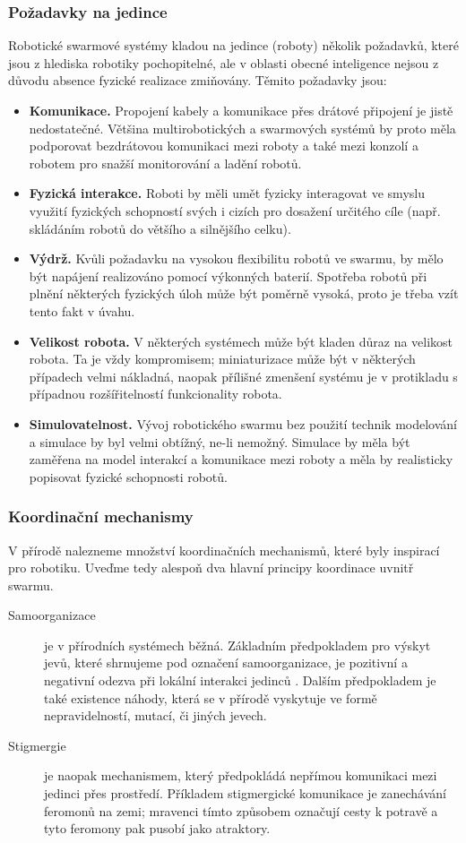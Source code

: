 \documentclass[a4paper,12pt]{article}
\begin{document}
\subsubsection{Požadavky na jedince}
Robotické swarmové systémy kladou na jedince (roboty) několik požadavků, které jsou
z hlediska robotiky pochopitelné, ale v oblasti obecné inteligence nejsou z důvodu
absence fyzické realizace zmiňovány. Těmito požadavky jsou:
\begin{itemize}
  \item {\bf Komunikace.} Propojení kabely a komunikace přes drátové připojení je jistě
    nedostatečné. Většina multirobotických a swarmových systémů by proto měla podporovat
    bezdrátovou komunikaci mezi roboty a také mezi konzolí a robotem pro snažší monitorování
    a ladění robotů.
  \item {\bf Fyzická interakce.} Roboti by měli umět fyzicky interagovat ve smyslu využití
    fyzických schopností svých i cizích pro dosažení určitého cíle (např. skládáním robotů
    do většího a silnějšího celku).
  \item {\bf Výdrž.} Kvůli požadavku na vysokou flexibilitu robotů ve swarmu, by mělo být
    napájení realizováno pomocí výkonných baterií. Spotřeba robotů při plnění některých
    fyzických úloh může být poměrně vysoká, proto je třeba vzít tento fakt v úvahu.
  \item {\bf Velikost robota.} V některých systémech může být kladen důraz na velikost robota.
    Ta je vždy kompromisem; miniaturizace může být v některých případech velmi nákladná,
    naopak přílišné zmenšení systému je v protikladu s případnou rozšířitelností funkcionality
    robota.
  \item {\bf Simulovatelnost.} Vývoj robotického swarmu bez použití technik modelování
    a simulace by byl velmi obtížný, ne-li nemožný. Simulace by měla být zaměřena na
    model interakcí a komunikace mezi roboty a měla by realisticky popisovat fyzické
    schopnosti robotů.
\end{itemize}

\subsubsection{Koordinační mechanismy}
V přírodě nalezneme množství koordinačních mechanismů, které byly inspirací pro robotiku.
Uveďme tedy alespoň dva hlavní principy koordinace uvnitř swarmu.
\begin{description}
  \item[Samoorganizace] {je v přírodních systémech běžná. Základním předpokladem pro
    výskyt jevů, které shrnujeme pod označení samoorganizace, je pozitivní a negativní
    odezva při lokální interakci jedinců \cite{Bonabeau99}. Dalším předpokladem je také
    existence náhody, která se v přírodě vyskytuje ve formě nepravidelností, mutací, či
    jiných jevech.}
  \item[Stigmergie] {je naopak mechanismem, který předpokládá nepřímou komunikaci
    mezi jedinci přes prostředí. Příkladem stigmergické komunikace je zanechávání feromonů
    na zemi; mravenci tímto způsobem označují cesty k potravě a tyto feromony pak pusobí
    jako atraktory.}
\end{description}
\end{document}
